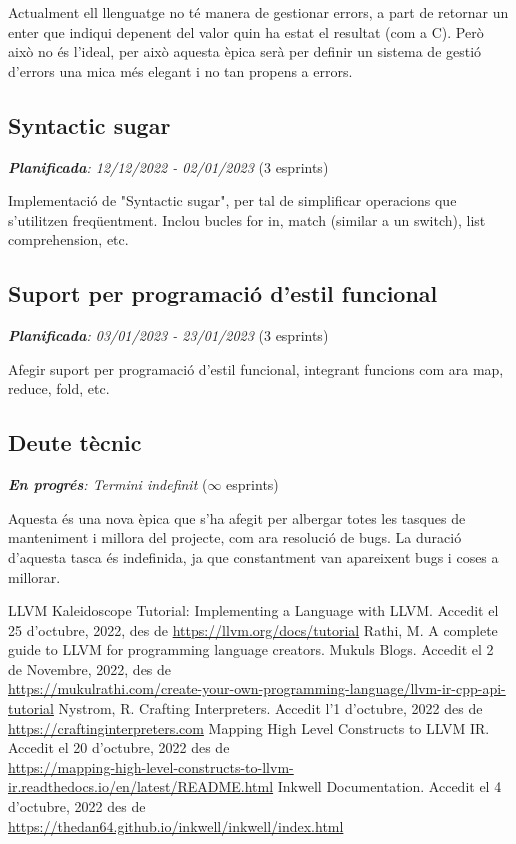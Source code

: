 ﻿\documentclass{article}
\begin{document}
Actualment ell llenguatge no té manera de gestionar errors, a part de retornar
un enter que indiqui depenent del valor quin ha estat el resultat (com a C). 
Però això no és l'ideal, per això aquesta èpica serà per definir un sistema de
gestió d'errors una mica més elegant i no tan propens a errors.

\subsection{Syntactic sugar}
\textit{\textbf{Planificada}: 12/12/2022 - 02/01/2023} (3 esprints)

Implementació de "Syntactic sugar", per tal de simplificar operacions que
s'utilitzen freqüentment. Inclou bucles for in, match (similar a un switch),
list comprehension, etc.

\subsection{Suport per programació d'estil funcional}
\textit{\textbf{Planificada}: 03/01/2023 - 23/01/2023} (3 esprints)

Afegir suport per programació d'estil funcional, integrant funcions com ara map,
reduce, fold, etc.

\subsection{Deute tècnic}
\textit{\textbf{En progrés}: Termini indefinit} ($\infty$ esprints)

Aquesta és una nova èpica que s'ha afegit per albergar totes les tasques de 
manteniment i millora del projecte, com ara resolució de bugs. La duració 
d'aquesta tasca és indefinida, ja que constantment van apareixent bugs i coses
a millorar.

\newpage
\renewcommand\refname{Bibliografia}
\begin{thebibliography}{9}

 LLVM Kaleidoscope Tutorial: Implementing a Language with LLVM. Accedit el 25 d'octubre, 2022, des de \url{https://llvm.org/docs/tutorial}
 Rathi, M. A complete guide to LLVM for programming language creators. Mukuls Blogs. Accedit el 2 de Novembre, 2022, des de \\\url{https://mukulrathi.com/create-your-own-programming-language/llvm-ir-cpp-api-tutorial}
 Nystrom, R. Crafting Interpreters. Accedit l'1 d'octubre, 2022 des de \\\url{https://craftinginterpreters.com}
 Mapping High Level Constructs to LLVM IR. Accedit el 20 d'octubre, 2022 des de \\\url{https://mapping-high-level-constructs-to-llvm-ir.readthedocs.io/en/latest/README.html}
 Inkwell Documentation. Accedit el 4 d'octubre, 2022 des de \\\url{https://thedan64.github.io/inkwell/inkwell/index.html}

\end{thebibliography}
\end{document}

